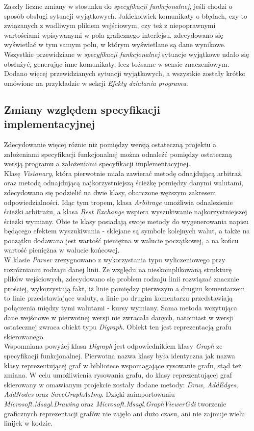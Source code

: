 \documentclass[a4paper,12pt]{article}
\newcommand\tab[1][0.6cm]{\hspace*{#1}}
\begin{document}
\tab Zaszły liczne zmiany w stosunku do \textit{specyfikacji funkcjonalnej}, jeśli chodzi o sposób obsługi sytuacji wyjątkowych. Jakiekolwiek komunikaty o błędach, czy to związanych z wadliwym plikiem wejściowym, czy też z niepoprawnymi wartościami wpisywanymi w pola graficznego interfejsu, zdecydowano się wyświetlać w tym samym polu, w którym wyświetlane są dane wynikowe. Wszystkie przewidziane w \textit{specyfikacji funkcjonalnej} sytuacje wyjątkowe udało się obsłużyć, generując inne komunikaty, lecz tożsame w sensie znaczeniowym. Dodano więcej przewidzianych sytuacji wyjątkowych, a wszystkie zostały krótko omówione na przykładzie w sekcji \textit{Efekty działania programu}.
\subsection{Zmiany względem specyfikacji implementacyjnej}

\tab Zdecydowanie więcej różnic niż pomiędzy wersją ostateczną projektu a założeniami specyfikacji funkcjonalnej można odnaleźć pomiędzy ostateczną wersją programu a założeniami specyfikacji implementacyjnej. 
\\\tab Klasę \textit{Visionary}, która pierwotnie miała zawierać metodę odnajdującą arbitraż, oraz metodą odnajdującą najkorzystniejszą ścieżkę pomiędzy danymi walutami, zdecydowano się podzielić na dwie klasy, obarczone węższym zakresem odpowiedzialności. Idąc tym tropem, klasa \textit{Arbitrage} umożliwia odnalezienie ścieżki arbitrażu, a klasa \textit{Best Exchange} wspiera wyszukiwanie najkorzystniejszej ścieżki wymiany. Obie te klasy posiadają swoje metody do wygenerowania napisu będącego efektem wyszukiwania - sklejane są symbole kolejnych walut, a także na początku dodawana jest wartość pieniężna w walucie początkowej, a na końcu wartość pieniężna w walucie końcowej. 
\\\tab W klasie \textit{Parser} zrezygnowano z wykorzystania typu wyliczeniowego przy rozróżnianiu rodzaju danej linii. Ze względu na nieskomplikowaną strukturę plików wejściowych, zdecydowano się problem rodzaju linii rozwiązać znacznie prościej, wykorzystują fakt, iż linie pomiędzy pierwszym a drugim komentarzem to linie przedstawiające waluty, a linie po drugim komentarzu przedstawiają połączenia między tymi walutami - kursy wymiany. Sama metoda wczytująca dane wejściowe w pierwotnej wersji nie zwracała danych, natomiast w wersji ostatecznej zwraca obiekt typu \textit{Digraph}. Obiekt ten jest reprezentacją grafu skierowanego.
\\\tab Wspomniana powyżej klasa \textit{Digraph} jest odpowiednikiem klasy \textit{Graph} ze specyfikacji funkcjonalnej. Pierwotna nazwa klasy była identyczna jak nazwa klasy reprezentującej graf w bibliotece wspomagające rysowanie grafu, stąd też zmiana. W celu umożliwienia rysowania grafu, do klasy reprezentującej graf skierowany w omawianym projekcie zostały dodane metody: \textit{Draw}, \textit{AddEdges}, \textit{AddNodes} oraz \textit{SaveGraphAsImg}. Dzięki zaimportowaniu \textit{Microsoft.Msagl.Drawing} oraz \textit{Microsoft.Msagl.GraphViewerGdi} tworzenie graficznych reprezentacji grafów nie zajęło ani dużo czasu, ani nie zajmuje wielu linijek w kodzie.
\end{document}
